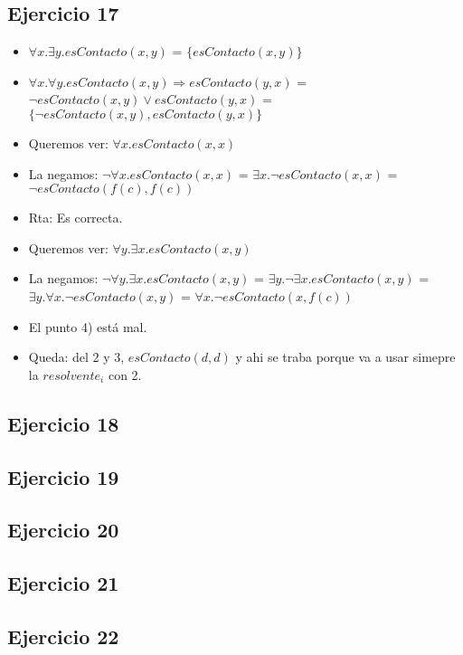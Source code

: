 \documentclass[10pt,a4paper]{article}
\begin{document}
  \subsection{Ejercicio 17}
\begin{itemize}
    \item $\forall x. \exists y. esContacto(x,y)$ = $\{esContacto(x,y)\}$
    \item $\forall x. \forall y. esContacto(x,y) \Rightarrow esContacto(y,x)$ = $\neg esContacto(x,y) \vee esContacto(y,x)$  = $\{\neg esContacto(x,y), esContacto(y,x)\}$ 
    \item Queremos ver: $\forall x. esContacto(x,x)$ 
    \item La negamos: $\neg \forall x. esContacto(x,x)$ = $\exists x. \neg esContacto(x,x)$ = $\neg esContacto(f(c),f(c))$
    \item Rta: Es correcta. \\ 
    \item Queremos ver: $\forall y. \exists x. esContacto(x,y)$ 
    \item La negamos: $\neg \forall y. \exists x. esContacto(x,y)$ = $\exists y. \neg \exists x. esContacto(x,y)$ = $\exists y. \forall x. \neg esContacto(x,y)$ = $\forall x. \neg esContacto(x,f(c))$  
    \item El punto 4) está mal. 
    \item Queda: del 2 y 3, $esContacto(d,d)$ y ahi se traba porque va a usar simepre la $resolvente_{i}$ con 2.
\end{itemize}
  \subsection{Ejercicio 18}
  \subsection{Ejercicio 19}
  \subsection{Ejercicio 20}
  \subsection{Ejercicio 21}
  \subsection{Ejercicio 22}
\end{document}
